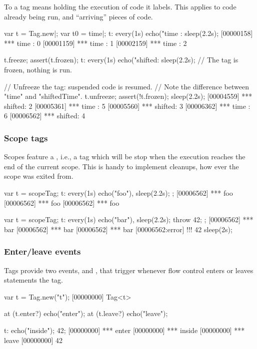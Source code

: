 To  a tag means holding the execution of code it labels.
This applies to code already being run, and ``arriving'' pieces of code.

\begin{urbiscript}[firstnumber=1]
var t = Tag.new|;
var t0 = time|;
t: every(1s) echo("time   : %
sleep(2.2s);
[00000158] *** time   : 0
[00001159] *** time   : 1
[00002159] *** time   : 2

t.freeze;
assert(t.frozen);
t: every(1s) echo("shifted: %
sleep(2.2s);
// The tag is frozen, nothing is run.

// Unfreeze the tag: suspended code is resumed.
// Note the difference between "time" and "shiftedTime".
t.unfreeze;
assert(!t.frozen);
sleep(2.2s);
[00004559] *** shifted: 2
[00005361] *** time   : 5
[00005560] *** shifted: 3
[00006362] *** time   : 6
[00006562] *** shifted: 4
\end{urbiscript}


\subsubsection{Scope tags}
\label{sec:specs:tag:scope}

Scopes feature a , i.e., a tag which will be stop
when the execution reaches the end of the current scope.  This is
handy to implement cleanups, how ever the scope was exited from.

\begin{urbiscript}[firstnumber=1]
{
  var t = scopeTag;
  t: every(1s)
      echo("foo"),
  sleep(2.2s);
};
[00006562] *** foo
[00006562] *** foo
[00006562] *** foo

{
  var t = scopeTag;
  t: every(1s)
      echo("bar"),
  sleep(2.2s);
  throw 42;
};
[00006562] *** bar
[00006562] *** bar
[00006562] *** bar
[00006562:error] !!! 42
sleep(2s);
\end{urbiscript}

\subsubsection{Enter/leave events}
\label{sec:specs:tag:enter-leave}

Tags provide two events,  and , that trigger
whenever flow control enters or leaves statements the tag.

\begin{urbiscript}[firstnumber=1]
var t = Tag.new("t");
[00000000] Tag<t>

at (t.enter?)
  echo("enter");
at (t.leave?)
  echo("leave");

t: {echo("inside"); 42};
[00000000] *** enter
[00000000] *** inside
[00000000] *** leave
[00000000] 42
\end{urbiscript}

